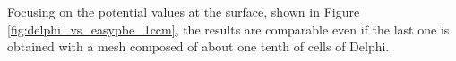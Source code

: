 \documentclass[11pt,a4paper]{article}
\begin{document}
Focusing on the potential values at the surface, shown in Figure \ref{fig:delphi_vs_easypbe_1ccm}, the results are comparable even if the last one is obtained with a mesh composed of about  one tenth of cells of Delphi. 

\begin{figure}[H]
    \centering
    \quad
\end{figure}
\end{document}
